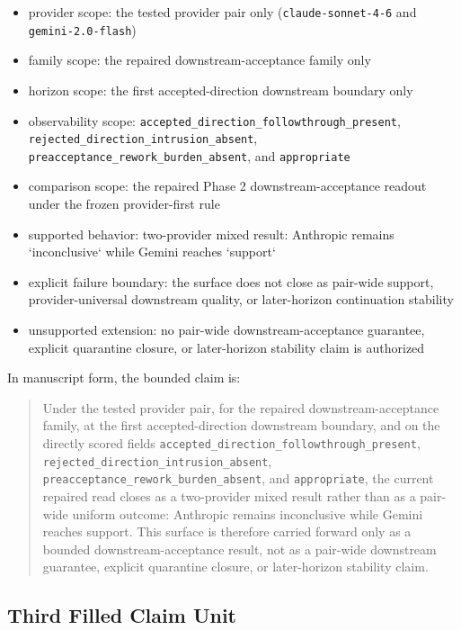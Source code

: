 \documentclass[11pt]{article}
\begin{document}
\begin{itemize}
\item provider scope:
  the tested provider pair only (\texttt{claude-sonnet-4-6} and
  \texttt{gemini-2.0-flash})
\item family scope:
  the repaired downstream-acceptance family only
\item horizon scope:
  the first accepted-direction downstream boundary only
\item observability scope:
  \texttt{accepted\_direction\_followthrough\_present},
  \texttt{rejected\_direction\_intrusion\_absent},
  \texttt{preacceptance\_rework\_burden\_absent}, and \texttt{appropriate}
\item comparison scope:
  the repaired Phase 2 downstream-acceptance readout under the frozen
  provider-first rule
\item supported behavior:
  two-provider mixed result:
  Anthropic remains `inconclusive` while Gemini reaches `support`
\item explicit failure boundary:
  the surface does not close as pair-wide support, provider-universal
  downstream quality, or later-horizon continuation stability
\item unsupported extension:
  no pair-wide downstream-acceptance guarantee, explicit quarantine closure, or
  later-horizon stability claim is authorized
\end{itemize}

In manuscript form, the bounded claim is:

\begin{quote}
Under the tested provider pair, for the repaired downstream-acceptance family,
at the first accepted-direction downstream boundary, and on the directly scored
fields
\texttt{accepted\_direction\_followthrough\_present},
\texttt{rejected\_direction\_intrusion\_absent},
\texttt{preacceptance\_rework\_burden\_absent}, and \texttt{appropriate}, the
current repaired read closes as a two-provider mixed result rather than as a
pair-wide uniform outcome: Anthropic remains inconclusive while Gemini reaches
support. This surface is therefore carried forward only as a bounded
downstream-acceptance result, not as a pair-wide downstream guarantee, explicit
quarantine closure, or later-horizon stability claim.
\end{quote}

\subsection{Third Filled Claim Unit}
\end{document}
